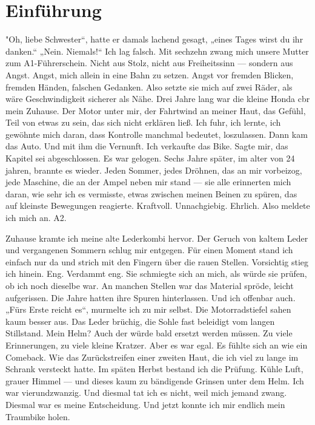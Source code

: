 \chapter{Einführung}
\label{chap:einfuehrung}

"Oh, liebe Schwester“, hatte er damals lachend gesagt, „eines Tages wirst du ihr danken.“
„Nein. Niemals!“
Ich lag falsch.
Mit sechzehn zwang mich unsere Mutter zum A1-Führerschein. Nicht aus Stolz, nicht aus Freiheitssinn — sondern aus Angst. Angst, mich allein in eine Bahn zu setzen. Angst vor fremden Blicken, fremden Händen, falschen Gedanken. Also setzte sie mich auf zwei Räder, als wäre Geschwindigkeit sicherer als Nähe.
Drei Jahre lang war die kleine Honda cbr mein Zuhause. Der Motor unter mir, der Fahrtwind an meiner Haut, das Gefühl, Teil von etwas zu sein, das sich nicht erklären ließ. Ich fuhr, ich lernte, ich gewöhnte mich daran, dass Kontrolle manchmal bedeutet, loszulassen.
Dann kam das Auto. Und mit ihm die Vernunft. Ich verkaufte das Bike. Sagte mir, das Kapitel sei abgeschlossen.
Es war gelogen.
Sechs Jahre später, im alter von 24 jahren,  brannte es wieder. Jeden Sommer, jedes Dröhnen, das an mir vorbeizog, jede Maschine, die an der Ampel neben mir stand — sie alle erinnerten mich daran, wie sehr ich es vermisste, etwas zwischen meinen Beinen zu spüren, das auf kleinste Bewegungen reagierte. Kraftvoll. Unnachgiebig. Ehrlich.
Also meldete ich mich an. A2.

Zuhause kramte ich meine alte Lederkombi hervor.
Der Geruch von kaltem Leder und vergangenen Sommern schlug mir entgegen. Für einen Moment stand ich einfach nur da und strich mit den Fingern über die rauen Stellen.
Vorsichtig stieg ich hinein.
Eng.
Verdammt eng.
Sie schmiegte sich an mich, als würde sie prüfen, ob ich noch dieselbe war. An manchen Stellen war das Material spröde, leicht aufgerissen. Die Jahre hatten ihre Spuren hinterlassen.
Und ich offenbar auch.
„Fürs Erste reicht es“, murmelte ich zu mir selbst.
Die Motorradstiefel sahen kaum besser aus. Das Leder brüchig, die Sohle fast beleidigt vom langen Stillstand.
Mein Helm? Auch der würde bald ersetzt werden müssen. Zu viele Erinnerungen, zu viele kleine Kratzer.
Aber es war egal.
Es fühlte sich an wie ein Comeback.
Wie das Zurückstreifen einer zweiten Haut, die ich viel zu lange im Schrank versteckt hatte.
Im späten Herbst bestand ich die Prüfung.
Kühle Luft, grauer Himmel — und dieses kaum zu bändigende Grinsen unter dem Helm.
Ich war vierundzwanzig.
Und diesmal tat ich es nicht, weil mich jemand zwang.
Diesmal war es meine Entscheidung.
Und jetzt konnte ich mir endlich mein Traumbike holen.


